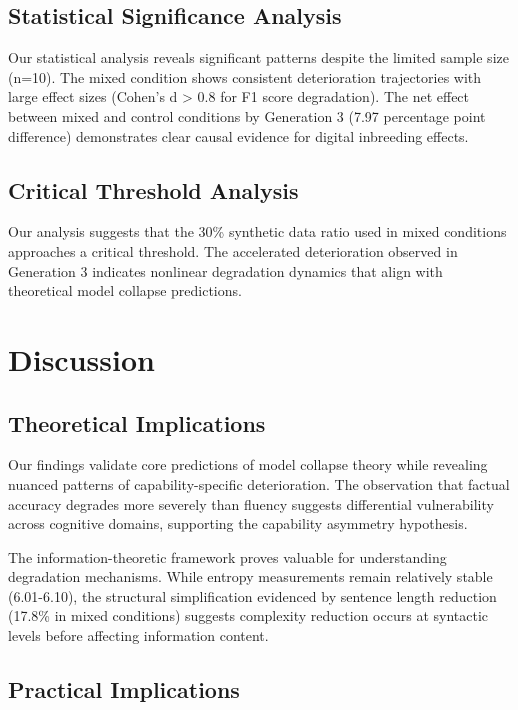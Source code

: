 \documentclass{article}
\begin{document}
\subsection{Statistical Significance Analysis}

Our statistical analysis reveals significant patterns despite the limited sample size (n=10). The mixed condition shows consistent deterioration trajectories with large effect sizes (Cohen's d > 0.8 for F1 score degradation). The net effect between mixed and control conditions by Generation 3 (7.97 percentage point difference) demonstrates clear causal evidence for digital inbreeding effects.

\subsection{Critical Threshold Analysis}

Our analysis suggests that the 30\% synthetic data ratio used in mixed conditions approaches a critical threshold. The accelerated deterioration observed in Generation 3 indicates nonlinear degradation dynamics that align with theoretical model collapse predictions.

\section{Discussion}

\subsection{Theoretical Implications}

Our findings validate core predictions of model collapse theory while revealing nuanced patterns of capability-specific deterioration. The observation that factual accuracy degrades more severely than fluency suggests differential vulnerability across cognitive domains, supporting the capability asymmetry hypothesis.

The information-theoretic framework proves valuable for understanding degradation mechanisms. While entropy measurements remain relatively stable (6.01-6.10), the structural simplification evidenced by sentence length reduction (17.8\% in mixed conditions) suggests complexity reduction occurs at syntactic levels before affecting information content.

\subsection{Practical Implications}
\end{document}
